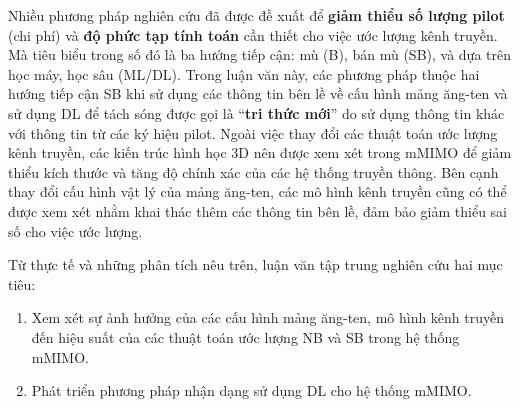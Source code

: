Nhiều phương pháp nghiên cứu đã được đề xuất để \textbf{giảm thiểu số lượng pilot} (chi phí) và \textbf{độ phức tạp tính toán} cần thiết cho việc ước lượng kênh truyền. Mà tiêu biểu trong số đó là ba hướng tiếp cận: mù (B), bán mù (SB), và dựa trên học máy, học sâu (ML/DL). Trong luận văn này, các phương pháp thuộc hai hướng tiếp cận SB khi sử dụng các thông tin bên lề về cấu hình mảng ăng-ten và sử dụng DL để tách sóng được gọi là ``\textbf{tri thức mới}''\cite{InSI} do sử dụng thông tin khác với thông tin từ các ký hiệu pilot.
Ngoài việc thay đổi các thuật toán ước lượng kênh truyền, 
các kiến trúc hình học 3D nên được xem xét trong mMIMO để giảm thiểu kích thước và tăng độ chính xác của các hệ thống truyền thông. Bên cạnh thay đổi cấu hình vật lý của mảng ăng-ten, các mô hình kênh truyền cũng có thể được xem xét nhằm khai thác thêm các thông tin bên lề, đảm bảo giảm thiểu sai số cho việc ước lượng.

Từ thực tế và những phân tích nêu trên, luận văn tập trung nghiên cứu hai mục tiêu:
\begin{enumerate}
    \item Xem xét sự ảnh hưởng của các cấu hình mảng ăng-ten, mô hình kênh truyền đến hiệu suất của các thuật toán ước lượng NB và SB trong hệ thống mMIMO.
    
    \item Phát triển phương pháp nhận dạng sử dụng DL cho hệ thống mMIMO.
\end{enumerate}
\vspace{0.5cm}

